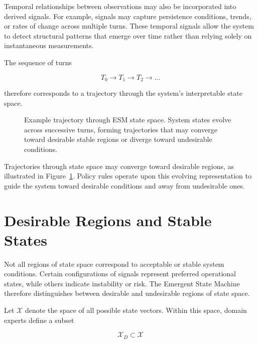 \documentclass[11pt]{article}
\begin{document}
Temporal relationships between observations may also be incorporated into derived signals. For example, signals may capture persistence conditions, trends, or rates of change across multiple turns. These temporal signals allow the system to detect structural patterns that emerge over time rather than relying solely on instantaneous measurements.

The sequence of turns

\begin{equation}
T_0 \rightarrow T_1 \rightarrow T_2 \rightarrow \dots
\end{equation}

therefore corresponds to a trajectory through the system's interpretable state space.

\begin{figure}[H]
\centering

\caption{Example trajectory through ESM state space. System states evolve across successive turns, forming trajectories that may converge toward desirable stable regions or diverge toward undesirable conditions.}
\label{fig:esm-attractor}
\end{figure}


Trajectories through state space may converge toward desirable regions, as illustrated in Figure~\ref{fig:esm-attractor}. Policy rules operate upon this evolving representation to guide the system toward desirable conditions and away from undesirable ones.



\section{Desirable Regions and Stable States}

Not all regions of state space correspond to acceptable or stable system conditions. Certain configurations of signals represent preferred operational states, while others indicate instability or risk. The Emergent State Machine therefore distinguishes between desirable and undesirable regions of state space.

Let $\mathcal{X}$ denote the space of all possible state vectors. Within this space, domain experts define a subset

\begin{equation}
\mathcal{X}_D \subset \mathcal{X}
\end{equation}
\end{document}
